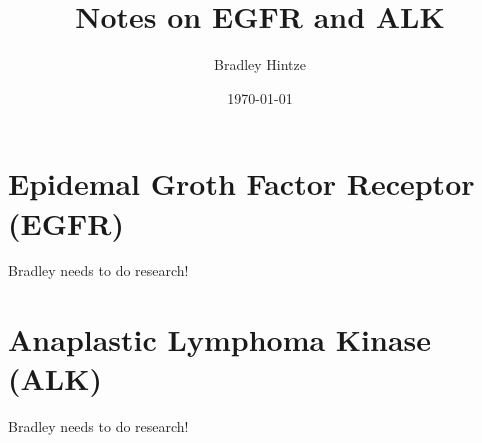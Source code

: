 \documentclass[12pt]{article}
\title{Notes on EGFR and ALK}
\author{Bradley Hintze}
\date{\today}
\begin{document}
\maketitle

\section{Epidemal Groth Factor Receptor (EGFR)}
Bradley needs to do research!

\section{Anaplastic Lymphoma Kinase (ALK)}
Bradley needs to do research!
\end{document}

